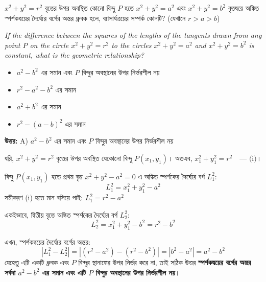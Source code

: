 \documentclass[12pt, a4paper]{article}
\begin{document}
\begin{tcolorbox}[questionbox={প্রশ্ন (Question) 33}]
    \noindent
    $x^2 + y^2 = r^2$ বৃত্তের উপর অবস্থিত কোনো বিন্দু $P$ হতে $x^2 + y^2 = a^2$ এবং $x^2 + y^2 = b^2$ বৃত্তদ্বয়ে অঙ্কিত স্পর্শকদ্বয়ের দৈর্ঘ্যের বর্গের অন্তর ধ্রুবক হলে, ব্যাসার্ধত্রয়ের সম্পর্ক কোনটি? (যেখানে  $r > a > b$)
    
    \vspace{0.8em}
    \begin{english}
    \noindent\textit{\color{darkgray}
    If the difference between the squares of the lengths of the tangents drawn from any point $P$ on the circle $x^2 + y^2 = r^2$ to the circles $x^2 + y^2 = a^2$ and $x^2 + y^2 = b^2$ is constant, what is the geometric relationship?
    }
    \end{english}
\end{tcolorbox}

\vspace{1em}
\begin{itemize}[label={}, leftmargin=1cm, itemsep=0.5em]
    \item[\textbf{A)}] $a^2 - b^2$ এর সমান এবং $P$ বিন্দুর অবস্থানের উপর নির্ভরশীল নয়
    \item[\textbf{B)}] $r^2 - a^2 - b^2$ এর সমান
    \item[\textbf{C)}] $a^2 + b^2$ এর সমান
    \item[\textbf{D)}] $r^2 - (a-b)^2$ এর সমান
\end{itemize}

\vspace{0.5em}
\begin{tcolorbox}[answerbox]
    \textbf{\color{success} উত্তর:} A) $a^2 - b^2$ এর সমান এবং $P$ বিন্দুর অবস্থানের উপর নির্ভরশীল নয়
\end{tcolorbox}
\vspace{1em}

\begin{tcolorbox}[solutionbox={সমাধান (Solution)}]
    \noindent
    ধরি, $x^2 + y^2 = r^2$ বৃত্তের উপর অবস্থিত যেকোনো বিন্দু $P(x_1, y_1)$। 
    অতএব, $x_1^2 + y_1^2 = r^2 \quad \text{--- (i)}$। 
    
    বিন্দু  $P(x_1, y_1)$ হতে প্রথম বৃত্ত $x^2 + y^2 - a^2 = 0$ এ অঙ্কিত স্পর্শকের দৈর্ঘ্যের বর্গ $L_1^2$:
    \[ L_1^2 = x_1^2 + y_1^2 - a^2 \]
    সমীকরণ (i) হতে মান বসিয়ে পাই: $L_1^2 = r^2 - a^2$
    
    একইভাবে, দ্বিতীয় বৃত্তে অঙ্কিত স্পর্শকের দৈর্ঘ্যের বর্গ  $L_2^2$:
    \[ L_2^2 = x_1^2 + y_1^2 - b^2 = r^2 - b^2 \]
    
    এখন, স্পর্শকদ্বয়ের দৈর্ঘ্যের বর্গের অন্তর:
    \[ |L_1^2 - L_2^2| = |(r^2 - a^2) - (r^2 - b^2)| = |b^2 - a^2| = a^2 - b^2 \]
    যেহেতু এটি একটি ধ্রুবক এবং  $P$ বিন্দুর স্থানাঙ্কের উপর নির্ভর করে না, তাই সঠিক উত্তর \textbf{স্পর্শকদ্বয়ের বর্গের অন্তর সর্বদা $a^2 - b^2$ এর সমান এবং এটি $P$ বিন্দুর অবস্থানের উপর নির্ভরশীল নয়}।
\end{tcolorbox}
\end{document}
